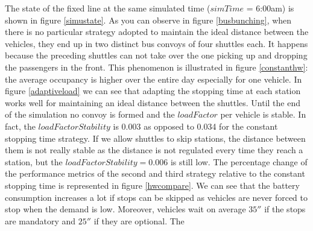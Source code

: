 \documentclass[12pt,a4paper]{article}
\begin{document}
The state of the fixed line at the same simulated time ($simTime$ = 6:00am) is shown in figure \ref{simustate}. As you can observe in figure \ref{busbunching}, when there is no particular strategy adopted to maintain the ideal distance between the vehicles, they end up in two distinct bus convoys of four shuttles each. It happens because the preceding shuttles can not take over the one picking up and dropping the passengers in the front. This phenomenon is illustrated in figure \ref{constanthw}: the average occupancy is higher over the entire day especially for one vehicle. In figure \ref{adaptiveload} we can see that adapting the stopping time at each station works well for maintaining an ideal distance between the shuttles. Until the end of the simulation no convoy is formed and the $loadFactor$ per vehicle is stable. In fact, the $loadFactorStability$ is 0.003 as opposed to 0.034 for the constant stopping time strategy. If we allow shuttles to skip stations, the distance between them is not really stable as the distance is not regulated every time they reach a station, but the $loadFactorStability =  0.006$ is still low.  The percentage change of the performance metrics of the second and third strategy relative to the constant stopping time is represented in figure \ref{hwcompare}. We can see that the battery consumption increases a lot if stops can be skipped as vehicles are never forced to stop when the demand is low. Moreover, vehicles wait on average $35''$ if the stops are mandatory and $25''$ if they are optional. The 
\end{document}
